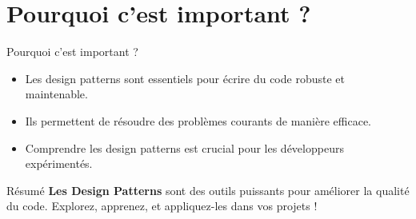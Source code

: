 \documentclass{clbeamer2024}
\begin{document}
	\section{Pourquoi c'est important ?}
	\begin{frame}{Pourquoi c'est important ?}
		\begin{itemize}
			\item Les design patterns sont essentiels pour écrire du code robuste et maintenable.
			\item Ils permettent de résoudre des problèmes courants de manière efficace.
			\item Comprendre les design patterns est crucial pour les développeurs expérimentés.
		\end{itemize}
	\end{frame}
	
	
	\begin{frame}{Résumé}
		\textbf{Les Design Patterns} sont des outils puissants pour améliorer la qualité du code.  
		Explorez, apprenez, et appliquez-les dans vos projets !
	\end{frame}
	
	
	

	
\end{document}
